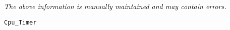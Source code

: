 \label{pkg:cpu\_timer}

{\tiny \it The above information is manually maintained and may contain errors.}
\begin{verbatim}
Cpu_Timer
\end{verbatim}

